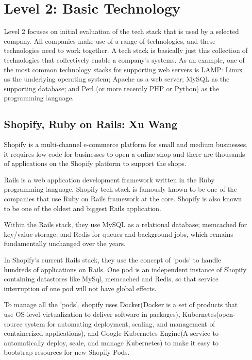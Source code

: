 \documentclass[a4paper, 11pt]{report}
\begin{document}

\newpage
\section{Level 2: Basic Technology}

Level 2 focuses on initial evaluation of the tech stack that is used by a selected company. All companies make use of a range of technologies, and these technologies need to work together. A tech stack is basically just this collection of technologies that collectively enable a company's systems. As an example, one of the most common technology stacks for supporting web servers is LAMP: Linux as the underlying operating system; Apache as a web server; MySQL as the supporting database; and Perl (or more recently PHP or Python) as the programming language.

\subsection{Shopify, Ruby on Rails: Xu Wang}
\indent Shopify is a multi-channel e-commerce platform for small and medium businesses, it requires low-code for businesses to open a online shop and there are thousands of applications on the Shopify platform to support the shops.

Rails is a web application development framework written in the Ruby programming language. Shopify tech stack is famously known to be one of the companies that use Ruby on Rails framework at the core. Shopify is also known to be one of the oldest and biggest Rails application. 

Within the Rails stack, they use MySQL as a relational database; memcached for key/value storage; and Redis for queues and background jobs, which remains fundamentally unchanged over the years.

In Shopify's current Rails stack, they use the concept of 'pods' to handle hundreds of applications on Rails. One pod is an independent instance of Shopify containing datastores like MySql, memcached and Redis, so that service interruption of one pod will not have global effects.

To manage all the 'pods', shopify uses Docker(Docker is a set of products that use OS-level virtualization to deliver software in packages), Kubernetes(open-source system for automating deployment, scaling, and management of containerized applications), and Google Kubernetes Engine(A service to automatically deploy, scale, and manage Kubernetes) to make it easy to bootstrap resources for new Shopify Pods.
\end{document}
